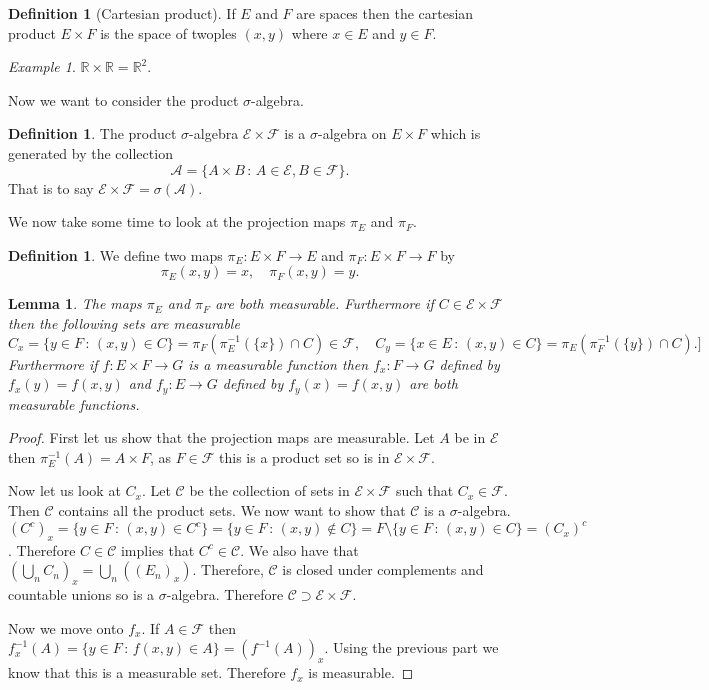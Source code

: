 \documentclass[11pt]{article}
\newtheorem{lem}[thm]{Lemma}
\theoremstyle{definition}
\newtheorem{dfn}[thm]{Definition}
\theoremstyle{remark}
\newtheorem{ex}[thm]{Example}
\begin{document}
\begin{dfn}[Cartesian product]
If $E$ and $F$ are spaces then the cartesian product $E \times F$ is the space of twoples $(x,y)$ where $x \in E$ and $y \in F$.
\end{dfn}
\begin{ex}
$\mathbb{R} \times \mathbb{R} = \mathbb{R}^2$.
\end{ex}

Now we want to consider the product $\sigma$-algebra. 
\begin{dfn}
The product $\sigma$-algebra $\mathcal{E} \times \mathcal{F}$ is a $\sigma$-algebra on $E \times F$ which is generated by the collection 
\[ \mathcal{A} = \{ A \times B \,:\, A \in \mathcal{E}, B \in \mathcal{F}\}. \] That is to say $\mathcal{E} \times \mathcal{F} = \sigma(\mathcal{A}).$
\end{dfn}

We now take some time to look at the projection maps $\pi_E$ and $\pi_F$. 
\begin{dfn}
We define two maps $\pi_E: E \times F \rightarrow E$ and $\pi_F: E \times F \rightarrow F$ by
\[ \pi_E (x,y) = x, \quad \pi_F(x,y) = y. \]
\end{dfn}

\begin{lem}
The maps $\pi_E$ and $\pi_F$ are both measurable. Furthermore if $C \in \mathcal{E} \times \mathcal{F}$ then the following sets are measurable
\[ C_x = \{ y \in F \,:\, (x,y) \in C \} = \pi_F\left(\pi_E^{-1}(\{x\}) \cap C\right) \in \mathcal{F} , \quad C_y = \{ x \in E \,:\, (x,y) \in C\} = \pi_E \left( \pi_F^{-1}(\{y\}) \cap C \right). ] \]
Furthermore if $f: E \times F \rightarrow G$ is a measurable function then $f_x: F \rightarrow G$ defined by $f_x(y) = f(x,y)$ and $f_y: E \rightarrow G$ defined by $f_y(x) = f(x,y)$ are both measurable functions. 
\end{lem}
\begin{proof}
First let us show that the projection maps are measurable. Let $A$ be in $\mathcal{E}$ then $\pi_E^{-1}(A) = A \times F$, as $F \in \mathcal{F}$ this is a product set so is in $\mathcal{E} \times \mathcal{F}$.

Now let us look at $C_x$. Let $\mathcal{C}$ be the collection of sets in $\mathcal{E} \times \mathcal{F}$ such that $C_x \in \mathcal{F}$. Then $\mathcal{C}$ contains all the product sets. We now want to show that $\mathcal{C}$ is a $\sigma$-algebra. $(C^c)_x = \{ y \in F \,:\, (x,y) \in C^c\} = \{ y \in F \, :\, (x,y) \notin C\}  = F \setminus \{ y \in F\,:\, (x,y) \in C\} = (C_x)^c$. Therefore $C \in \mathcal{C}$ implies that $C^c \in \mathcal{C}$. We also have that $\left(\bigcup_n C_n \right)_x = \bigcup_n \left( (E_n)_x \right)$. Therefore, $\mathcal{C}$ is closed under complements and countable unions so is a $\sigma$-algebra. Therefore $\mathcal{C} \supset \mathcal{E} \times \mathcal{F}$.

Now we move onto $f_x$. If $A \in \mathcal{F}$ then $f_x^{-1}(A) = \{ y \in F \,:\, f(x,y) \in A\} = (f^{-1}(A))_x$. Using the previous part we know that this is a measurable set. Therefore $f_x$ is measurable.
\end{proof}
\end{document}
